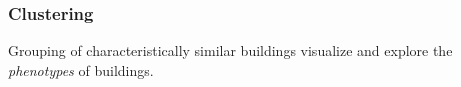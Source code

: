 \subsubsection{Clustering}
\label{sec:clustering}

Grouping of characteristically similar buildings visualize and explore the \emph{phenotypes} of buildings.
